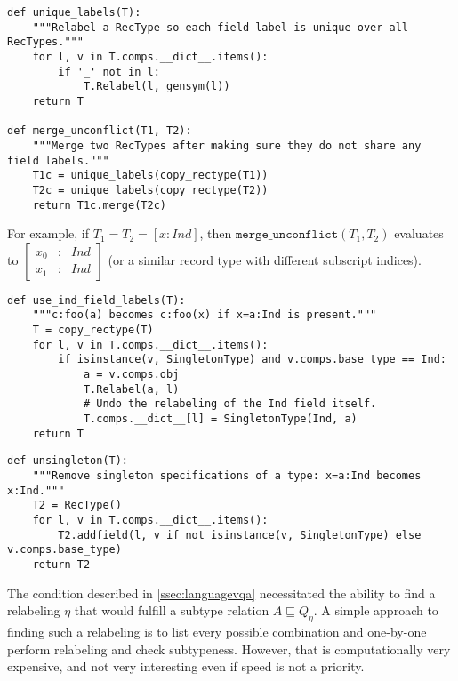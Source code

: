 \begin{lstlisting}[label={lst:mergeunconflict},caption={merge\_unconflict()}]
def unique_labels(T):
    """Relabel a RecType so each field label is unique over all RecTypes."""
    for l, v in T.comps.__dict__.items():
        if '_' not in l:
            T.Relabel(l, gensym(l))
    return T

def merge_unconflict(T1, T2):
    """Merge two RecTypes after making sure they do not share any field labels."""
    T1c = unique_labels(copy_rectype(T1))
    T2c = unique_labels(copy_rectype(T2))
    return T1c.merge(T2c)
\end{lstlisting}

For example, if $T_1 = T_2 = [x:Ind]$, then $\mathtt{merge\_unconflict}(T_1, T_2)$ evaluates to $\left[\begin{array}{rcl} x_0&:&Ind \\ x_1&:&Ind \end{array}\right]$ (or a similar record type with different subscript indices).

\begin{lstlisting}[label={lst:useindfieldlabels},caption={use\_ind\_field\_labels()}]
def use_ind_field_labels(T):
    """c:foo(a) becomes c:foo(x) if x=a:Ind is present."""
    T = copy_rectype(T)
    for l, v in T.comps.__dict__.items():
        if isinstance(v, SingletonType) and v.comps.base_type == Ind:
            a = v.comps.obj
            T.Relabel(a, l)
            # Undo the relabeling of the Ind field itself.
            T.comps.__dict__[l] = SingletonType(Ind, a)
    return T
\end{lstlisting}

\begin{lstlisting}[label={lst:unsingleton},caption={unsingleton()}]
def unsingleton(T):
    """Remove singleton specifications of a type: x=a:Ind becomes x:Ind."""
    T2 = RecType()
    for l, v in T.comps.__dict__.items():
        T2.addfield(l, v if not isinstance(v, SingletonType) else v.comps.base_type)
    return T2
\end{lstlisting}

The condition described in \autoref{ssec:languagevqa} necessitated the ability to find a relabeling $\eta$ that would fulfill a subtype relation $A \sqsubseteq Q_\eta$.
A simple approach to finding such a relabeling is to list every possible combination and one-by-one perform relabeling and check subtypeness.
However, that is computationally very expensive, and not very interesting even if speed is not a priority.

